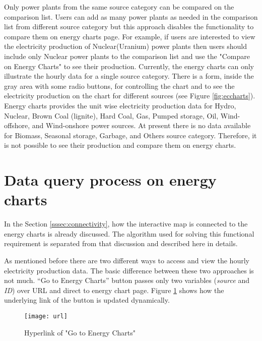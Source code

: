 Only power plants from the same source category can be compared on the comparison list. Users can add as many power plants as needed in the comparison list from different source category but this approach disables the functionality to compare them on energy charts page. For example, if users are interested to view the electricity production of Nuclear(Uranium) power plants then users should include only Nuclear power plants to the comparison list and use the "Compare on Energy Charts" to see their production. Currently, the energy charts can only illustrate the hourly data for a single source category. There is a form, inside the gray area with some radio buttons, for controlling the chart and to see the electricity production on the chart for different sources (see Figure \ref{fig:eccharts}). Energy charts provides the unit wise electricity production data for Hydro, Nuclear, Brown Coal (lignite), Hard Coal, Gas, Pumped storage, Oil, Wind-offshore, and Wind-onshore power sources. At present there is no data available for Biomass, Seasonal storage, Garbage, and Others source category. Therefore, it is not possible to see their production and compare them on energy charts.   

\section{Data query process on energy charts}
\label{sec:algorithm}

In the Section \ref{sssec:connectivity}, how the interactive map is connected to the energy charts is already discussed. The algorithm used for solving this functional requirement is separated from that discussion and described here in details. 

As mentioned before there are two different ways to access and view the hourly electricity production data. The basic difference between these two approaches is not much. “Go to Energy Charts” button passes only two variables (\textit{source} and \textit{ID}) over URL and direct to energy chart page. Figure \ref{fig:url} shows how the underlying link of the button is updated dynamically. 

\begin{figure} [H]
\centering
\texttt{[image: url]}
\caption{Hyperlink of "Go to Energy Charts"}
\label{fig:url}
\end{figure}

